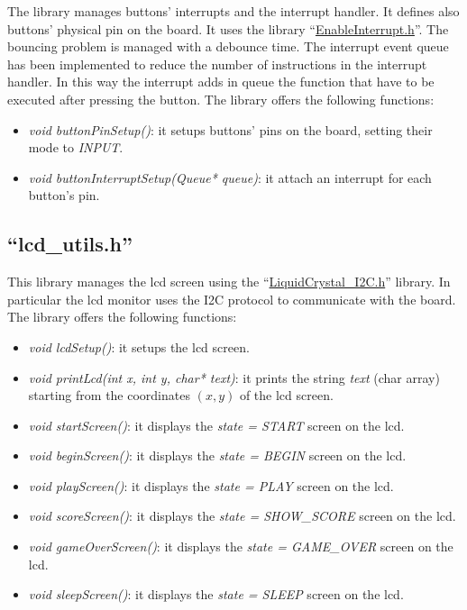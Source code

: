 \documentclass[a4paper,12pt]{report}
\begin{document}
    The library manages buttons' interrupts and the interrupt handler. It defines also buttons' physical pin on the board. It uses the library ``\href{https://github.com/GreyGnome/EnableInterrupt}{EnableInterrupt.h}''. The bouncing problem is managed with a debounce time. 
    \newline
    The interrupt event queue has been implemented to reduce the number of instructions in the interrupt handler. In this way the interrupt adds in queue the function that have to be executed after pressing the button. 
    \newline
    \newline
    The library offers the following functions:
    \begin{itemize}
        \item \textit{void buttonPinSetup()}: it setups buttons' pins on the board, setting their mode to \textit{INPUT}. 
        \item \textit{void buttonInterruptSetup(Queue* queue)}: it attach an interrupt for each button's pin.
    \end{itemize}
    
    \subsection{``lcd\_utils.h''}

    This library manages the lcd screen using the ``\href{https://github.com/johnrickman/LiquidCrystal_I2C}{LiquidCrystal\_I2C.h}'' library. In particular the lcd monitor uses the I2C protocol to communicate with the board. 
    \newline
    \newline
    The library offers the following functions:
    \begin{itemize}
        \item \textit{void lcdSetup()}: it setups the lcd screen.
        \item \textit{void printLcd(int x, int y, char* text)}: it prints the string \textit{text} (char array) starting from the coordinates $(x, y)$ of the lcd screen. 
        \item \textit{void startScreen()}: it displays the \textit{state = START} screen on the lcd.
        \item \textit{void beginScreen()}: it displays the \textit{state = BEGIN} screen on the lcd.
        \item \textit{void playScreen()}: it displays the \textit{state = PLAY} screen on the lcd.
        \item \textit{void scoreScreen()}: it displays the \textit{state = SHOW\_SCORE} screen on the lcd.
        \item \textit{void gameOverScreen()}: it displays the \textit{state = GAME\_OVER} screen on the lcd.
        \item \textit{void sleepScreen()}: it displays the \textit{state = SLEEP} screen on the lcd.
    \end{itemize}
    
\end{document}
